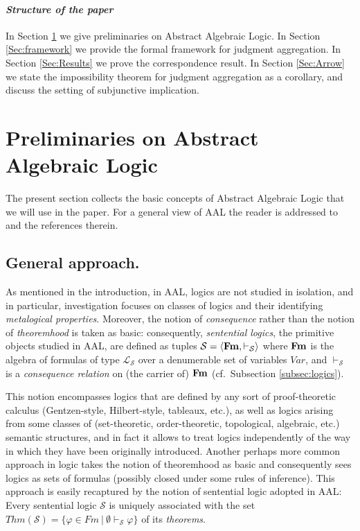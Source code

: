 \documentclass{llncs}
\numberwithin{equation}{section}
\newcommand{\s}{\mathcal{S}}
\newcommand{\Ls}{\mathcal{L}_{\s}}
\newcommand{\CRS}{\vdash_{\mathcal{S}}}
\begin{document}
\paragraph{\bf\em Structure of the paper} In Section \ref{sec:preliminaries} we give preliminaries on Abstract Algebraic Logic. In Section \ref{Sec:framework} we provide the formal framework for judgment aggregation. In Section \ref{Sec:Results} we prove the correspondence result. In Section \ref{Sec:Arrow} we state the impossibility theorem for judgment aggregation as a corollary, and discuss the setting of subjunctive implication.

\section{Preliminaries on Abstract Algebraic Logic}
\label{sec:preliminaries}
The present section collects the basic concepts of Abstract Algebraic Logic that we will use in the paper.
For a general view of AAL the reader is addressed to \cite{FoJa96} and the references therein.

\subsection{General approach.} As mentioned in the introduction, in AAL,  logics are not studied in isolation, and in particular,  investigation focuses on classes of logics and their identifying {\em metalogical properties}.  Moreover, the notion of {\em consequence} rather than the notion of {\em theoremhood} is taken as basic: consequently, {\em sentential logics}, the primitive objects studied in AAL, are defined as tuples $\s = \langle\Fm, \CRS\rangle$ where $\mathbf{Fm}$ is the algebra of formulas of type $\Ls$ over a denumerable set of variables $Var$, and $\CRS$ is a {\em consequence relation } on (the carrier of) $\mathbf{Fm}$ (cf.\ Subsection \ref{subsec:logics}).

\noindent This notion encompasses logics that are defined by any sort of proof-theoretic calculus (Gentzen-style, Hilbert-style, tableaux, etc.), as well as logics arising from some classes of (set-theoretic, order-theoretic, topological, algebraic, etc.) semantic structures, and in fact it allows to treat logics independently of the way in which they have been originally introduced. Another perhaps more common approach in logic takes the notion of theoremhood as basic and consequently sees logics as sets of formulas (possibly closed under some rules of inference). This approach is easily recaptured by the notion of sentential logic adopted in AAL: Every sentential logic $\s$ is uniquely associated with the set  $Thm(\s) = \{\varphi\in Fm\ |\ \emptyset\CRS\varphi\}$ of its {\em theorems}.
\end{document}
